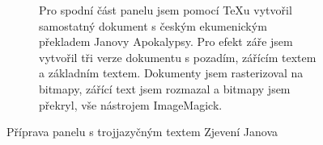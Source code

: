 \begin{figure}[p]
\begin{subfigure}{\linewidth}
\centering
{}
\par\vspace{-1.5pt}
\caption{Pro spodní část panelu jsem pomocí \TeX u vytvořil samostatný dokument s českým ekumenickým překladem Janovy Apokalypsy. Pro efekt záře jsem vytvořil tři verze dokumentu s pozadím, zářícím textem a základním textem. Dokumenty jsem rasterizoval na bitmapy, zářící text jsem rozmazal a bitmapy jsem překryl, vše nástrojem ImageMagick.}
\label{fig:screen2-texts-czech}
\end{subfigure}
\caption{Příprava panelu s trojjazyčným textem Zjevení Janova}
\label{fig:screen2-texts}
\end{figure}